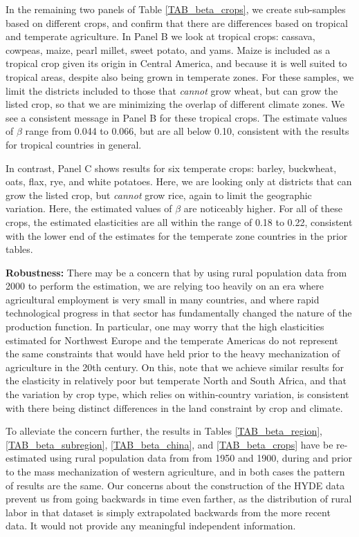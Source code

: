 \documentclass[11pt]{article}
\begin{document}
In the remaining two panels of Table \ref{TAB_beta_crops}, we create sub-samples based on different crops, and confirm that there are differences based on tropical and temperate agriculture. In Panel B we look at tropical crops: cassava, cowpeas, maize, pearl millet, sweet potato, and yams. Maize is included as a tropical crop given its origin in Central America, and because it is well suited to tropical areas, despite also being grown in temperate zones. For these samples, we limit the districts included to those that \textit{cannot} grow wheat, but can grow the listed crop, so that we are minimizing the overlap of different climate zones. We see a consistent message in Panel B for these tropical crops. The estimate values of $\beta$ range from 0.044 to 0.066, but are all below 0.10, consistent with the results for tropical countries in general.

In contrast, Panel C shows results for six temperate crops: barley, buckwheat, oats, flax, rye, and white potatoes. Here, we are looking only at districts that can grow the listed crop, but \textit{cannot} grow rice, again to limit the geographic variation. Here, the estimated values of $\beta$ are noticeably higher. For all of these crops, the estimated elasticities are all within the range of 0.18 to 0.22, consistent with the lower end of the estimates for the temperate zone countries in the prior tables.

\vspace{.5cm}\noindent\textbf{Robustness:} There may be a concern that by using rural population data from 2000 to perform the estimation, we are relying too heavily on an era where agricultural employment is very small in many countries, and where rapid technological progress in that sector has fundamentally changed the nature of the production function. In particular, one may worry that the high elasticities estimated for Northwest Europe and the temperate Americas do not represent the same constraints that would have held prior to the heavy mechanization of agriculture in the 20th century. On this, note that we achieve similar results for the elasticity in relatively poor but temperate North and South Africa, and that the variation by crop type, which relies on within-country variation, is consistent with there being distinct differences in the land constraint by crop and climate. 

To alleviate the concern further, the results in Tables \ref{TAB_beta_region}, \ref{TAB_beta_subregion}, \ref{TAB_beta_china}, and \ref{TAB_beta_crops} have be re-estimated using rural population data from \citet{hyde31} from 1950 and 1900, during and prior to the mass mechanization of western agriculture, and in both cases the pattern of results are the same. Our concerns about the construction of the HYDE data prevent us from going backwards in time even farther, as the distribution of rural labor in that dataset is simply extrapolated backwards from the more recent data. It would not provide any meaningful independent information.
\end{document}
